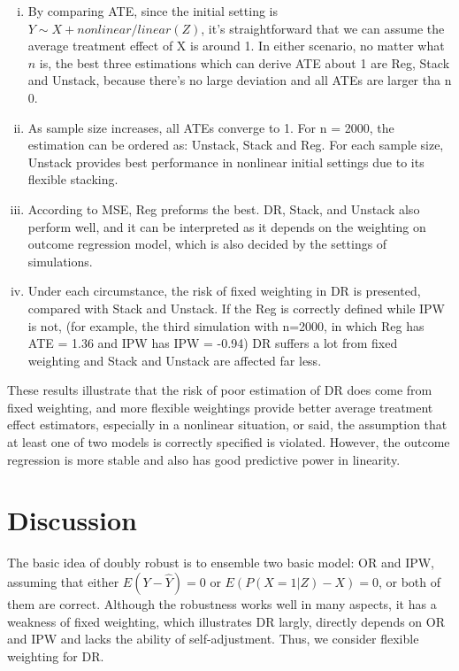 \documentclass{elegantpaper}
\begin{document}
\begin{enumerate}[(i)]
\item By comparing ATE, since the initial setting is $Y \sim X + nonlinear/linear(Z)$, it's straightforward that we can assume the average treatment effect of X is around 1. In either scenario, no matter what $n$ is, the best three estimations which can derive ATE about 1 are Reg, Stack and Unstack, because there's no large deviation and all ATEs are larger tha n 0. 
\item As sample size increases, all ATEs converge to 1. For n = 2000, the estimation can be ordered as: Unstack, Stack and Reg. For each sample size, Unstack provides best performance in nonlinear initial settings due to its flexible stacking.
\item According to MSE, Reg preforms the best. DR, Stack, and Unstack also perform well, and it can be interpreted as it depends on the weighting on outcome regression model, which is also decided by the settings of simulations.
\item Under each circumstance, the risk of fixed weighting in DR is presented, compared with Stack and Unstack. If the Reg is correctly defined while IPW is not, (for example, the third simulation with n=2000, in which Reg has ATE = 1.36 and IPW has IPW = -0.94) DR suffers a lot from fixed weighting and Stack and Unstack are affected far less.
\end{enumerate}
\smallskip
\smallskip
  
These results illustrate that the risk of poor estimation of DR does come from fixed weighting, and more flexible weightings provide better average treatment effect estimators, especially in a nonlinear situation, or said, the assumption that at least one of two models is correctly specified is violated. However, the outcome regression is more stable and also has good predictive power in linearity.  

\section{Discussion}
The basic idea of doubly robust is to ensemble two basic model: OR and IPW, assuming that either $E(Y-\hat{Y})=0$ or $E(P(X=1 | Z)-X)=0$, or both of them are correct. Although the robustness works well in many aspects, it has a weakness of fixed weighting, which illustrates DR largly, directly depends on OR and IPW and lacks the ability of self-adjustment. Thus, we consider flexible weighting for DR.
\end{document}
